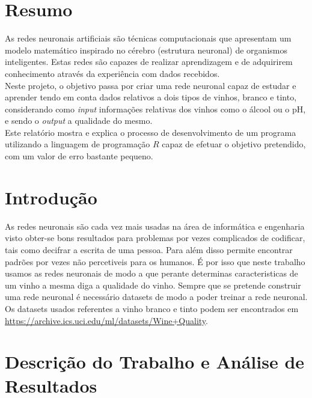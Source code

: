 \documentclass{article}
\begin{document}
\section{Resumo}
As redes neuronais artificiais são técnicas computacionais que apresentam um modelo matemático inspirado no cérebro (estrutura neuronal) de organismos inteligentes. Estas redes são capazes de realizar aprendizagem e de adquirirem conhecimento através da experiência com dados recebidos.\\
Neste projeto, o objetivo passa por criar uma rede neuronal capaz de estudar e aprender tendo em conta dados relativos a dois tipos de vinhos, branco e tinto, considerando como \textit{input} informações relativas dos vinhos como o álcool ou o pH, e sendo o \textit{output} a qualidade do mesmo.\\
Este relatório mostra e explica o processo de desenvolvimento de um programa utilizando a linguagem de programação $R$ capaz de efetuar o objetivo pretendido, com um valor de erro bastante pequeno.  

\vspace*{\fill}

\newpage

\vspace*{\fill}
\tableofcontents
\vspace*{\fill}

\newpage

\vspace*{\fill}
\section{Introdução}
As redes neuronais são cada vez mais usadas na área de informática e engenharia visto obter-se bons resultados para problemas por vezes complicados de codificar, tais como decifrar a escrita de uma pessoa. Para além disso permite encontrar padrões por vezes não percetiveis para os humanos. É por isso que neste trabalho usamos as redes neuronais de modo a que perante determinas caracteristicas de um vinho a mesma diga a qualidade do vinho. Sempre que se pretende construir uma rede neuronal é necessário datasets de modo a poder treinar a rede neuronal. Os datasets usados referentes a vinho branco e tinto podem ser encontrados em \url{https://archive.ics.uci.edu/ml/datasets/Wine+Quality}.
\vspace*{\fill}

\newpage

\section{Descrição do Trabalho e Análise de Resultados}
\end{document}
